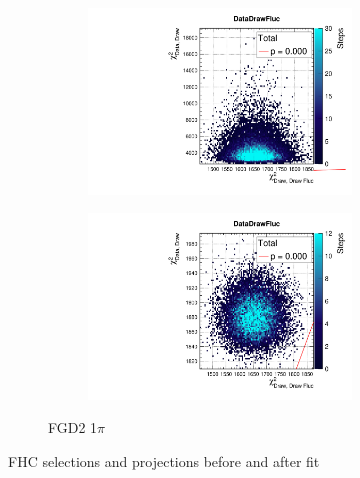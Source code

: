 \begin{figure}[h]
\begin{subfigure}[t]{\textwidth}
\begin{subfigure}[t]{0.24\textwidth}
\includegraphics[width=\textwidth, trim={0mm 0mm 0mm 8mm}, clip,page=47]{figures/mach3/data/priorpred/2017b_NewDet_3Xsec_4Det_5Flux_NewXSecTune_Data_merge_PriorPred_procs}
\end{subfigure}
\begin{subfigure}[t]{0.24\textwidth}
	\includegraphics[width=\textwidth, trim={0mm 0mm 0mm 8mm}, clip,page=47]{figures/mach3/data/postpred/2017b_NewData_NewDet_UpdXsecStep_2Xsec_4Det_5Flux_0_PostPred_procs}
\end{subfigure}
\caption{FGD2 1$\pi$}
\end{subfigure}
\caption{FHC selections \pmu and \cosmu projections before and after fit}
\label{fig:fhc_postfit_0pi_1pi}
\end{figure}

